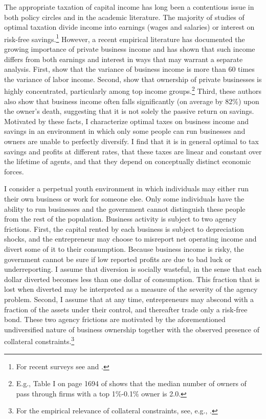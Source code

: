 \documentclass[11pt]{article}
\theoremstyle{plain}
\theoremstyle{definition} %
\begin{document}
The appropriate taxation of capital income has long been a contentious issue in both policy circles and in the academic literature. The majority of studies of optimal taxation divide income into earnings (wages and salaries) or interest on risk-free savings.\footnote{For recent surveys see \cite{bastani_how_2020} and \cite{stantcheva_dynamic_2020}.} However, a recent empirical literature has documented the growing importance of private business income and has shown that such income differs from both earnings and interest in ways that may warrant a separate analysis. First, \cite{debacker_risky_2022} show that the variance of business income is more than 60 times the variance of labor income. Second, \cite{smith_capitalists_2019} show that ownership of private businesses is highly concentrated, particularly among top income groups.\footnote{E.g., Table I on page 1694 of \cite{smith_capitalists_2019} shows that the median number of owners of pass through firms with a top 1\%-0.1\% owner is 2.0.} Third, these authors also show that business income often falls significantly (on average by 82\%) upon the owner's death, suggesting that it is not solely the passive return on savings. Motivated by these facts, I characterize optimal taxes on business income and savings in an environment in which only some people can run businesses and owners are unable to perfectly diversify. I find that it is in general optimal to tax savings and profits at different rates, that these taxes are linear and constant over the lifetime of agents, and that they depend on conceptually distinct economic forces. 

I consider a perpetual youth environment in which individuals may either run their own business or work for someone else. Only some individuals have the ability to run businesses and the government cannot distinguish these people from the rest of the population. Business activity is subject to two agency frictions. First, the capital rented by each business is subject to depreciation shocks, and the entrepreneur may choose to misreport net operating income and divert some of it to their consumption. Because business income is risky, the government cannot be sure if low reported profits are due to bad luck or underreporting. I assume that diversion is socially wasteful, in the sense that each dollar diverted becomes less than one dollar of consumption. This fraction that is lost when diverted may be interpreted as a measure of the severity of the agency problem. Second, I assume that at any time, entrepreneurs may abscond with a fraction of the assets under their control, and thereafter trade only a risk-free bond. These two agency frictions are motivated by the aforementioned undiversified nature of business ownership together with the observed presence of collateral constraints.\footnote{For the empirical relevance of collateral constraints, see, e.g., \cite{cagetti_entrepreneurship_2006}.}
\end{document}
